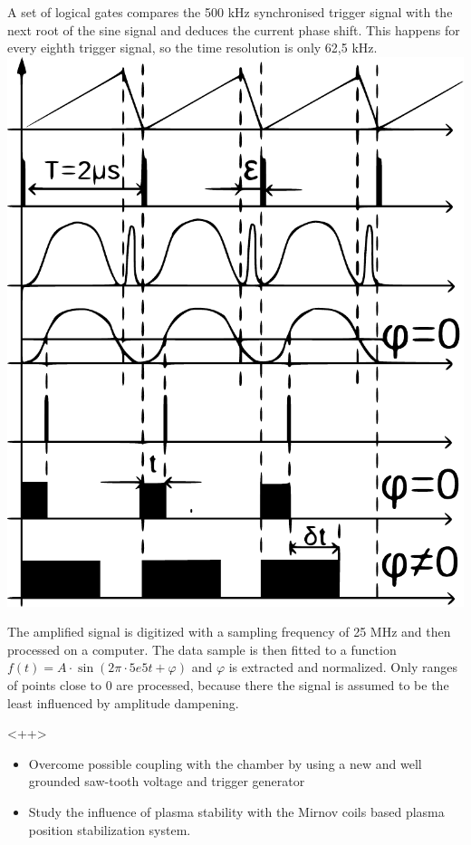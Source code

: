 \documentclass[portrait,final,a0paper]{baposter}
\def\bi{\begin{itemize}}
\def\ei{\end{itemize}}
\def\im{\item}
\newcommand{\compresslist}{%
\setlength{\itemsep}{1pt}%
\setlength{\parskip}{0pt}%
\setlength{\parsep}{0pt}%
}
\begin{document}
\begin{poster}

 {
 \begin{multicols}{2}
 A set of logical gates compares the 500 kHz synchronised trigger signal with the next root of the sine signal and deduces the current phase shift. This happens for every eighth trigger signal, so the time resolution is only 62,5 kHz.\\
 \includegraphics[width=.5\textwidth]{images/analog.pdf}
 \end{multicols}
 }
 {
The amplified signal is digitized with a sampling frequency of 25 MHz and then processed on a computer. The data sample is then fitted to a function $f(t)=A \cdot \sin (2\pi\cdot 5e5 t + \varphi)$ and $\varphi$ is extracted and normalized. Only ranges of points close to $0$ are processed, because there the signal is assumed to be the least influenced by amplitude dampening.
 }

 {
 }<++>
{
\begin{itemize}
        \compresslist
    \item  Overcome possible coupling with the chamber by using a new and well grounded saw-tooth voltage and trigger generator
    \item Study the influence of plasma stability with the Mirnov coils based plasma position stabilization system.
\end{itemize}
}


\end{poster}
\end{document}
